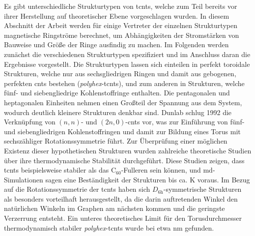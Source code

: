 Es gibt unterschiedliche Strukturtypen von \acp{tcnt}, welche zum Teil bereits vor ihrer Herstellung auf theoretischer Ebene vorgeschlagen wurden. In diesem Abschnitt der Arbeit werden für einige Vertreter der einzelnen Strukturtypen magnetische Ringströme berechnet, um Abhängigkeiten der Stromstärken von Bauweise und Größe der Ringe ausfindig zu machen. Im Folgenden werden zunächst die verschiedenen Strukturtypen spezifiziert und im Anschluss daran die Ergebnisse vorgestellt.   
Die Strukturtypen lassen sich einteilen in perfekt toroidale Strukturen, welche nur aus sechsgliedrigen Ringen und damit aus gebogenen, perfekten \acp{cnt} bestehen (\textit{polyhex}-\acp{tcnt}), und zum anderen in Strukturen, welche fünf- und siebengliedrige Kohlenstoffringe enthalten. Die pentagonalen und heptagonalen Einheiten nehmen einen Großteil der Spannung aus dem System, wodurch deutlich kleinere Strukturen denkbar sind. Dunlab\supercite{dunlap1992connecting} schlug 1992 die Verknüpfung von $(n,n)$- und $(2n,0)$-\acp{cnt} vor, was zur Einführung von fünf- und siebengliedrigen Kohlenstoffringen und damit zur Bildung eines Torus mit sechszähliger Rotationssymmetrie führt. Zur Überprüfung einer möglichen Existenz dieser hypothetischen Strukturen wurden zahlreiche theoretische Studien über ihre thermodynamische Stabilität durchgeführt. Diese Studien zeigen, dass \acp{tcnt} beispielsweise stabiler als das C$_{60}$-Fulleren\supercite{dunlap1992connecting,itoh1993toroidal,ihara1993toroidal,itoh1993toroidal2} sein können, und \ac{md}-Simulationen\supercite{itoh1993toroidal,hod2003carbon,tacsci2005stability,chen2011thermal} sagen eine Beständigkeit der Strukturen bis ca. \unit[2000]{K} voraus. Im Bezug auf die Rotationssymmetrie der \acp{tcnt} haben sich $D_{\text{6h}}$-symmetrische Strukturen als besonders vorteilhaft herausgestellt,\supercite{liu2011structure,ihara1995helically} da die darin auftretenden Winkel den natürlichen Winkeln im Graphen am nächsten kommen und die geringste Verzerrung entsteht. Ein unteres theoretisches Limit für den Torusdurchmesser thermodynamisch stabiler \textit{polyhex}-\acp{tcnt} wurde bei etwa \unit[200]{nm} gefunden.\supercite{meunier1998atomic}\\

